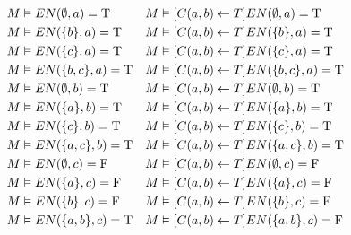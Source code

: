 \begin{frame}
    \begin{align*}
        M & \vDash EN(\emptyset,a)       = \mathrm{T}              &
        M & \vDash[C(a,b)\leftarrow T] EN(\emptyset,a)       = \mathrm{T}   \\
        M & \vDash EN(\{b\},a)    = \mathrm{T}              &
        M & \vDash[C(a,b)\leftarrow T] EN(\{b\},a)    = \mathrm{T}   \\
        M & \vDash EN(\{c\},a)    = \mathrm{T}              &
        M & \vDash[C(a,b)\leftarrow T] EN(\{c\},a)    = \mathrm{T}   \\
        M & \vDash EN(\{b,c\},a)  = \mathrm{T}              &
        M & \vDash[C(a,b)\leftarrow T] EN(\{b,c\},a)  = \mathrm{T}   \\
        M & \vDash EN(\emptyset,b)       = \mathrm{T}              &
        M & \vDash[C(a,b)\leftarrow T] EN(\emptyset,b)       = \mathrm{T}   \\
        M & \vDash EN(\{a\},b)    = \mathrm{T}              &
        M & \vDash[C(a,b)\leftarrow T] EN(\{a\},b)    = \mathrm{T}   \\
        M & \vDash EN(\{c\},b)    = \mathrm{T}              &
        M & \vDash[C(a,b)\leftarrow T] EN(\{c\},b)    = \mathrm{T}   \\
        M & \vDash EN(\{a,c\},b)  = \mathrm{T}              &
        M & \vDash[C(a,b)\leftarrow T] EN(\{a,c\},b)  = \mathrm{T}   \\
        M & \vDash EN(\emptyset,c)       = \mathrm{F}              &
        M & \vDash[C(a,b)\leftarrow T] EN(\emptyset,c)       = \mathrm{F}   \\
        M & \vDash EN(\{a\},c)    = \mathrm{F}              &
        M & \vDash[C(a,b)\leftarrow T] EN(\{a\},c)    = \mathrm{F}   \\
        M & \vDash EN(\{b\},c)    = \mathrm{F}              &
        M & \vDash[C(a,b)\leftarrow T] EN(\{b\},c)    = \mathrm{F}   \\
        M & \vDash EN(\{a,b\},c)  = \mathrm{T}              &
        M & \vDash[C(a,b)\leftarrow T] EN(\{a,b\},c)  = \mathrm{F}   \\
    \end{align*}
\end{frame}

\begin{frame}
    \begin{center}
    \end{center}
\end{frame}
